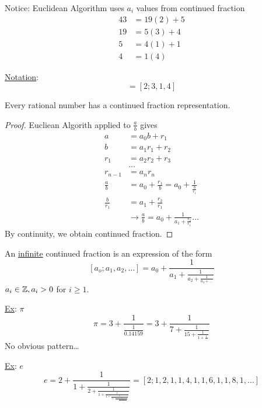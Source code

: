     Notice: Euclidean Algorithm uses $a_i$ values from continued fraction
    \begin{align*}
        43 &= 19(2) + 5 \\
        19 &= 5(3) + 4 \\
        5  &= 4(1) + 1 \\
        4  &= 1(4)
    \end{align*}

    \underline{Notation}: 
    \[
        = [2; 3, 1, 4]
    \]

    \begin{theorem}
        Every rational number has a continued fraction representation. 
        \begin{proof}
            Eucliean Algorith applied to $\frac{a}{b}$ gives
            \begin{align*}
                a &= a_0 b + r_1 \\ 
                b &= a_1 r_1 + r_2 \\
                r_1 &= a_2 r_2 + r_3 \\
                &\dots \\
                r_{n-1} &= a_n r_n \\
                \frac{a}{b}   &= a_0 + \frac{r_1}{b} = a_0 + \frac{1}{\frac{b}{r_1}} \\
                \frac{b}{r_1} &= a_1 + \frac{r_2}{r_1} \\
                &\rightarrow \frac{a}{b} = a_0 + \frac{1}{a_1 + \frac{r_2}{r_1}} \dots
            \end{align*}
            By continuity, we obtain continued fraction.
        \end{proof}
    \end{theorem}

    \begin{definition}
        An \underline{infinite} continued fraction is an expression of the form 
        \[
            [a_o; a_1, a_2, \dots] = a_0 + \frac{1}{a_1 + \frac{1}{a_2 + \frac{1}{a_3 + \dots}}}
        \]
        $a_i\in\mathbb{Z}, a_i > 0$ for $i\ge 1$.
    \end{definition}

    \underline{Ex}: $\pi$
    \[
        \pi = 3 + \frac{1}{\frac{1}{0.14159}} = 3 + \frac{1}{7 + \frac{1}{15 + \frac{1}{1 + \frac{1}{\dots}}}}
    \]
    No obvious pattern\dots

    \underline{Ex}: $e$
    \[
        e = 2 + \frac{1}{1 + \frac{1}{2 + \frac{1}{1 + \frac{1}{1 + \frac{1}{4 + \frac{1}{1 + \frac{1}{1 + \frac{1}{6 + \frac{1}{1 + \frac{1}{\dots}}}}}}}}}} = [2;1,2,1,1,4,1,1,6,1,1,8,1,\dots]
    \]

